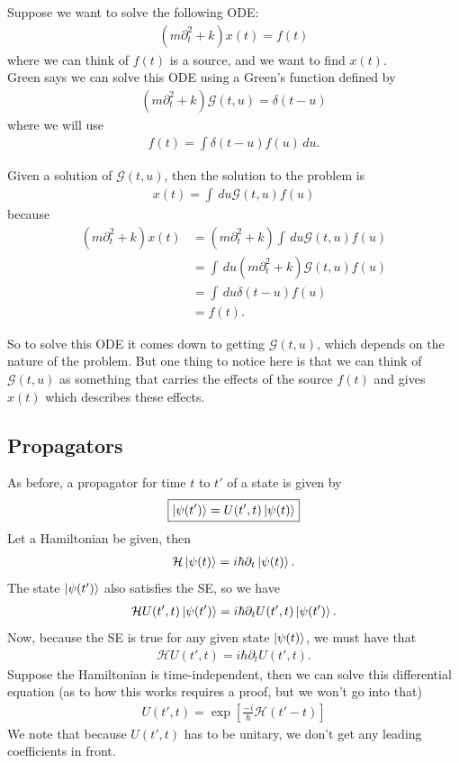 \documentclass{book}
\theoremstyle{definition}
\newcommand{\p}{\partial}
\newcommand{\ham}{\mathcal{H}}
\newcommand{\G}{\mathcal{G}}
\newcommand{\f}[2]{\frac{#1}{#2}}
\newcommand{\lp}{\left(}
\newcommand{\rp}{\right)}
\newcommand{\lb}{\left[}
\newcommand{\rb}{\right]}
\begin{document}
Suppose we want to solve the following ODE:
\begin{align}
\lp m \p_t^2 + k \rp x(t) = f(t)
\end{align}
where we can think of $f(t)$ is a source, and we want to find $x(t)$. \\

Green says we can solve this ODE using a Green's function defined by
\begin{align}
\lp m \p_t^2 + k \rp \G(t,u) = \delta(t - u)
\end{align}
where we will use
\begin{align}
f(t) = \int \delta(t-u) f(u)\,du.
\end{align}

Given a solution of $\G(t,u)$, then the solution to the problem is
\begin{align}
\boxed{x(t) = \int \,du \G(t,u)f(u)}
\end{align}
because
\begin{align}
\lp m \p_t^2 + k \rp x(t) &= \lp m \p_t^2 + k \rp \int \,du \G(t,u)f(u)\\
&= \int \,du  \lp m \p_t^2 + k \rp \G(t,u)f(u)\\
&= \int \,du \delta(t-u)f(u)\\
&= f(t).
\end{align}


So to solve this ODE it comes down to getting $\G(t,u)$, which depends on the nature of the problem. But one thing to notice here is that we can think of $\G(t,u)$ as something that carries the effects of the source $f(t)$ and gives $x(t)$ which describes these effects. 




\subsection{Propagators}



As before, a propagator for time $t$ to $t'$ of a state is given by
\begin{align}
\boxed{\ket{\psi(t')} = U(t',t)\ket{\psi(t)}}
\end{align}
Let a Hamiltonian be given, then
\begin{align}
\ham \ket{\psi(t)} = i\hbar \p_t \ket{\psi(t)}.
\end{align}
The state $\ket{\psi(t')}$ also satisfies the SE, so we have
\begin{align}
\ham U(t',t)\ket{\psi(t')} = i\hbar \p_t U(t',t)\ket{\psi(t')}.
\end{align}
Now, because the SE is true for any given state $\ket{\psi(t)}$, we must have that
\begin{align}
\ham U(t',t) = i\hbar \p_t U(t',t).
\end{align}
Suppose the Hamiltonian is time-independent, then we can solve this differential equation (as to how this works requires a proof, but we won't go into that)
\begin{align}
\boxed{U(t',t) = \exp\lb \f{-i}{\hbar}\ham (t'-t) \rb}
\end{align}
We note that because $U(t',t)$ has to be unitary, we don't get any leading coefficients in front. \\
\end{document}
